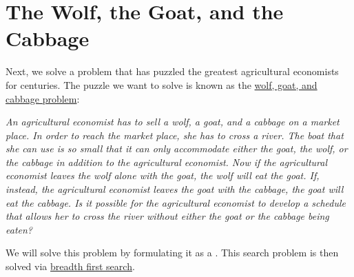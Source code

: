  
\section{The Wolf, the Goat, and the Cabbage}
Next,  we solve a problem that has puzzled the greatest agricultural economists for centuries.  The puzzle we
want to solve is known as the  
\href{https://en.wikipedia.org/wiki/Wolf,_goat_and_cabbage_problem}{wolf, goat, and cabbage problem}:  
\vspace*{0.3cm}

\begin{minipage}[c]{15cm}
{\sl
An agricultural economist has to sell a wolf, a goat, and a cabbage on a market place.  In order to
reach the market place, she has to cross a river.  The boat that she can use is so small that it can
only accommodate either the goat, the wolf, or the cabbage in addition to the agricultural economist.
Now if the agricultural economist leaves the wolf alone with the goat, the wolf will eat the goat.
If, instead, the agricultural economist leaves the goat with the cabbage, the goat will eat the cabbage.
Is it possible for the agricultural economist to develop a schedule that allows her to cross the river
without either the goat or the cabbage being eaten?
}
\end{minipage}
\vspace*{0.3cm}

\noindent
We will solve this problem by formulating it as a .  This search problem is then solved
via \href{https://en.wikipedia.org/wiki/Breadth-first_search}{breadth first search}.


